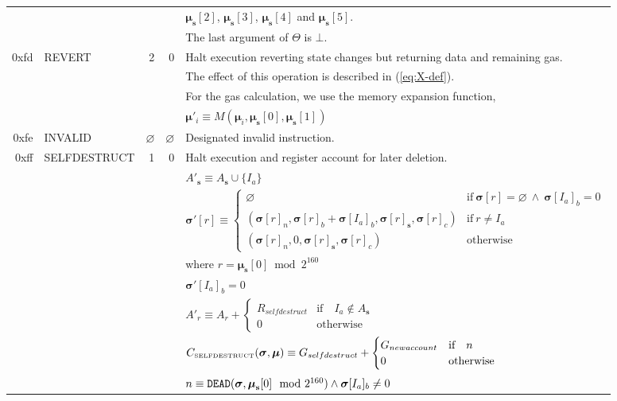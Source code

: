 \documentclass[9pt,oneside]{amsart}
\begin{document}
\begin{tabular*}{\columnwidth}[h]{rlrrl}
&&&& $\boldsymbol{\mu}_\mathbf{s}[2]$, $\boldsymbol{\mu}_\mathbf{s}[3]$, $\boldsymbol{\mu}_\mathbf{s}[4]$ and $\boldsymbol{\mu}_\mathbf{s}[5]$. \\
&&&& The last argument of $\Theta$ is $\bot$. \\
\midrule
0xfd & {\small REVERT} & 2 & 0 & Halt execution reverting state changes but returning data and remaining gas. \\
&&&& The effect of this operation is described in (\ref{eq:X-def}). \\
&&&& For the gas calculation, we use the memory expansion function, \\
&&&& $\boldsymbol{\mu}'_i \equiv M(\boldsymbol{\mu}_i, \boldsymbol{\mu}_\mathbf{s}[0], \boldsymbol{\mu}_\mathbf{s}[1])$ \\
\midrule
0xfe & {\small INVALID} & $\varnothing$ & $\varnothing$ & Designated invalid instruction. \\
\midrule
0xff & {\small SELFDESTRUCT} & 1 & 0 & Halt execution and register account for later deletion. \\
&&&& $A'_\mathbf{s} \equiv A_\mathbf{s} \cup \{ I_a \}$ \\
&&&& $\boldsymbol{\sigma}'[r] \equiv \begin{cases}
\varnothing &\text{if}\ \boldsymbol{\sigma}[r] = \varnothing\ \wedge\ \boldsymbol{\sigma}[I_a]_b = 0\\
(\boldsymbol{\sigma}[r]_n, \boldsymbol{\sigma}[r]_b + \boldsymbol{\sigma}[I_a]_b, \boldsymbol{\sigma}[r]_\mathbf{s}, \boldsymbol{\sigma}[r]_c) & \text{if}\ r \neq I_a \\
(\boldsymbol{\sigma}[r]_n, 0, \boldsymbol{\sigma}[r]_\mathbf{s}, \boldsymbol{\sigma}[r]_c) & \text{otherwise}
\end{cases}$\\
&&&& where $r = \boldsymbol{\mu}_\mathbf{s}[0] \bmod 2^{160}$\\
&&&& $\boldsymbol{\sigma}'[I_a]_b = 0$ \\
&&&& $A'_{r} \equiv A_{r} + \begin{cases}
R_{selfdestruct} & \text{if} \quad I_a \notin A_\mathbf{s} \\
0 & \text{otherwise}
\end{cases}$ \\
&&&& $C_{\text{\tiny SELFDESTRUCT}}(\boldsymbol{\sigma}, \boldsymbol{\mu}) \equiv G_{selfdestruct} + \begin{cases}
G_{newaccount} & \text{if} \quad n \\
0 & \text{otherwise}
\end{cases}$ \\
&&&& $n \equiv \mathtt{\tiny DEAD}(\boldsymbol{\sigma}, \boldsymbol{\mu}_\mathbf{s}[0] \mod 2^{160}) \wedge \boldsymbol{\sigma}[I_a]_b \neq 0$ \\
\bottomrule
\end{tabular*}
\end{document}
